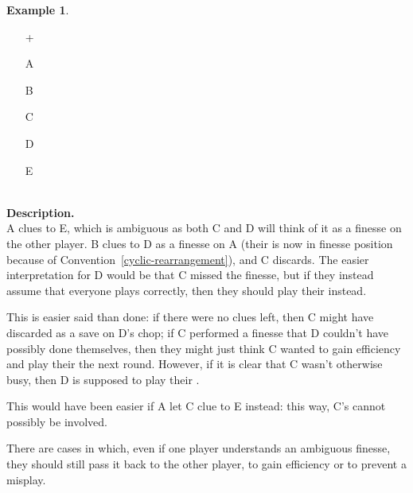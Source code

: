 \documentclass[a4paper]{article}
\theoremstyle{plain}
\theoremstyle{definition}
\newtheorem{example}[theorem]{Example}
\begin{document}
\begin{example}	\hfill \\
	\label{ex:ambiguous-finesse}
	\begin{minipage}{0.45\textwidth}
		\begin{itemize}
			\item[\Large +]      
			\item[\Large A]    
			\item[\Large B]    
			\item[\Large C]     
			\item[\Large D]    
			\item[\Large E]    
		\end{itemize}
	\end{minipage}%
	\begin{minipage}{0.55\textwidth}
		\hfill \\
		
		\textbf{Description.} \\
		
		A clues  to E, which is ambiguous as both C and D will think of it as a finesse on the other player. B clues  to D as a finesse on A (their  is now in finesse position because of Convention~\ref{cyclic-rearrangement}), and C discards. The easier interpretation for D would be that C missed the finesse, but if they instead assume that everyone plays correctly, then they should play their  instead.
		
		This is easier said than done: if there were no clues left, then C might have discarded as a save on D's chop; if C performed a finesse that D couldn't have possibly done themselves, then they might just think C wanted to gain efficiency and play their  the next round. However, if it is clear that C wasn't otherwise busy, then D is supposed to play their .
		
		This would have been easier if A let C clue  to E instead: this way, C's  cannot possibly be involved.
	\end{minipage}
\end{example} \vspace{0.15 cm}

There are cases in which, even if one player understands an ambiguous finesse, they should still pass it back to the other player, to gain efficiency or to prevent a misplay.
\end{document}
